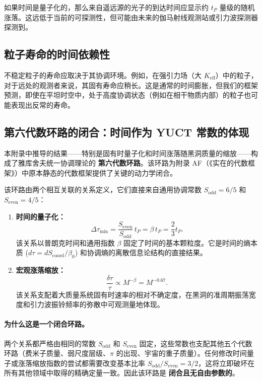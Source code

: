 \documentclass[12pt,a4paper]{article}
\newcommand{\Keff}{K_{\mathrm{eff}}}
\begin{document}
	如果时间是量子化的，那么来自遥远源的光子的到达时间应显示约 \(t_P\) 量级的随机涨落。这远低于当前的可探测性，但可能由未来的伽马射线观测站或引力波探测器探测到。
	
	\subsection{粒子寿命的时间依赖性}
	
	不稳定粒子的寿命应取决于其协调环境。例如，在强引力场（大 \(\Keff\)）中的粒子，对于远处的观测者来说，其固有寿命应稍长。这是通常的时间膨胀，但我们的框架预测，即使在平坦时空中，处于高度协调状态（例如在相干物质内部）的粒子也可能表现出反常的寿命。
	
	\subsection{第六代数环路的闭合：时间作为 YUCT 常数的体现}
	
	本附录中推导的结果——特别是固有时量子化和时间涨落随黑洞质量的缩放——构成了雅库舍夫统一协调理论的 \textbf{第六代数环路}。该环路为附录 AF（《实在的代数框架》）中原本静态的代数框架提供了关键的动力学闭合。
	
	该环路由两个相互关联的关系定义，它们直接来自通用协调常数 \(S_{\mathrm{odd}} = 6/5\) 和 \(S_{\mathrm{even}} = 4/5\)：
	
	\begin{enumerate}
		\item \textbf{时间的量子化：}
		\begin{equation}
			\Delta \tau_{\min} = \frac{S_{\mathrm{even}}}{S_{\mathrm{odd}}} \, t_P = \beta \, t_P = \frac{2}{3} t_P.
			\label{eq:loop6-quantization}
		\end{equation}
		该关系以普朗克时间和通用指数 \(\beta\) 固定了时间的基本颗粒度。它是时间的熵本质 (\(d\tau = dS_{\mathrm{coord}} / \beta_0\)) 和协调熵的离散信息论结构的直接结果。
		
		\item \textbf{宏观涨落缩放：}
		\begin{equation}
			\frac{\delta \tau}{\tau} \propto M^{-\beta} = M^{-0.67}.
			\label{eq:loop6-fluctuation}
		\end{equation}
		该关系支配着大质量系统固有时速率的相对不确定度，在黑洞的准周期振荡宽度和引力波振铃频率的弥散中可观测量地体现。
	\end{enumerate}
	
	\paragraph{为什么这是一个闭合环路。}
	两个关系都严格由相同的常数 \(S_{\mathrm{odd}}\) 和 \(S_{\mathrm{even}}\) 固定，这些常数也支配其他五个代数环路（费米子质量、弱尺度层级、\(\pi\) 的出现、宇宙的重子质量）。任何修改时间量子或涨落缩放指数的尝试都需要改变基本比率 \(S_{\mathrm{odd}}/S_{\mathrm{even}} = 3/2\)，这将立即破坏在所有其他领域中取得的精确定量一致。因此该环路是 \textbf{闭合且无自由参数的}。
	
\end{document}
